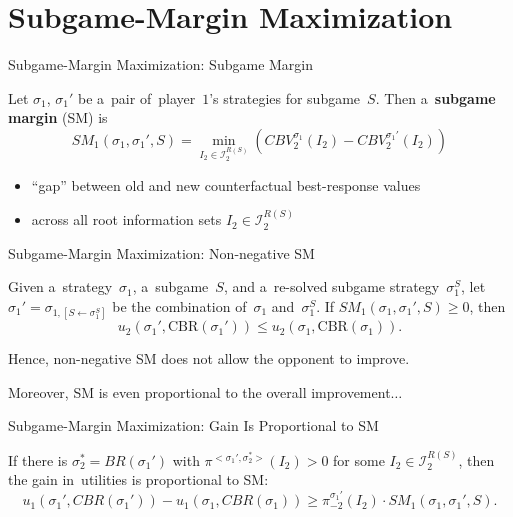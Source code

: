 \documentclass{beamer}
\theoremstyle{definition}
\newcommand{\I}{\mathcal{I}}
\begin{document}
  \section{Subgame-Margin Maximization}
  {
    \begin{frame}{Subgame-Margin Maximization: Subgame Margin}
      \pause
      \begin{framed}
        Let $\sigma_1$, $\sigma_1'$ be a~pair of~player~$1$'s strategies for subgame~$S$.
        Then a~\textbf{subgame margin} (SM) is
        \[
          SM_1 (\sigma_1, \sigma_1' , S) =
          \min_{I_2 \in \I_2^{R(S)}}
          \left( CBV_2^{\sigma_1} (I_2) - CBV_2^{\sigma_1'} (I_2) \right)
        \]
      \end{framed}
      \pause

      \begin{itemize}[<+- | alert@+>]
        \item ``gap'' between old and new counterfactual best-response values
        \item across all root information sets $I_2 \in \I_2^{R(S)}$
      \end{itemize}
    \end{frame}

    \begin{frame}{Subgame-Margin Maximization: Non-negative SM}
      \begin{framed}
        \begin{Theorem}
          Given a~strategy~$\sigma_1$, a~subgame~$S$, and a~re-solved subgame strategy~$\sigma_1^S$, let $\sigma_1' = \sigma_{1, [S \leftarrow \sigma_1^S]}$ be the combination of~$\sigma_1$ and~$\sigma_1^S$.
          If $SM_1 (\sigma_1, \sigma_1' , S) \geq 0$, then
          \[
            u_2(\sigma_1', \textrm{CBR}(\sigma_1')) \leq  u_2(\sigma_1, \textrm{CBR}(\sigma_1)).
          \]
        \end{Theorem}
      \end{framed}
      \pause

      Hence, non-negative SM does not allow the opponent to improve.
      \pause

      Moreover, SM is even proportional to the overall improvement$\ldots$
    \end{frame}

    \begin{frame}{Subgame-Margin Maximization: Gain Is Proportional to SM}
      \pause
      \begin{framed}
        \begin{theorem}
          If there is $\sigma_2^* = BR(\sigma_1')$ with $\pi^{<\sigma_1',\sigma_2^*>} (I_2) > 0$ for some $I_2 \in\I_2^{R(S)}$, then the gain in~utilities is proportional to SM:
          \[
            u_1(\sigma_1', CBR(\sigma_1')) - u_1(\sigma_1, CBR(\sigma_1)) \ge \pi_{-2}^{\sigma_1'} (I_2) \cdot SM_1(\sigma_1, \sigma_1', S).
          \]
        \end{theorem}
      \end{framed}
      \pause


\end{frame}}
\end{document}
